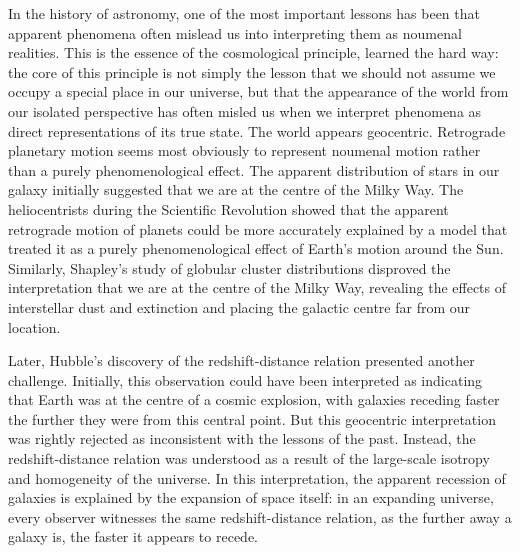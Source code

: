 \documentclass[aps,rmp,groupedaddress,twocolumn,10pt]{revtex4-2}
\begin{document}
In the history of astronomy, one of the most important lessons has been that apparent phenomena often mislead us into interpreting them as noumenal realities. This is the essence of the cosmological principle, learned the hard way: the core of this principle is not simply the lesson that we should not assume we occupy a special place in our universe, but that the appearance of the world from our isolated perspective has often misled us when we interpret phenomena as direct representations of its true state. The world appears geocentric. Retrograde planetary motion seems most obviously to represent noumenal motion rather than a purely phenomenological effect. The apparent distribution of stars in our galaxy initially suggested that we are at the centre of the Milky Way. The heliocentrists during the Scientific Revolution showed that the apparent retrograde motion of planets could be more accurately explained by a model that treated it as a purely phenomenological effect of Earth's motion around the Sun. Similarly, Shapley's study of globular cluster distributions disproved the interpretation that we are at the centre of the Milky Way, revealing the effects of interstellar dust and extinction and placing the galactic centre far from our location.

Later, Hubble's discovery of the redshift-distance relation presented another challenge. Initially, this observation could have been interpreted as indicating that Earth was at the centre of a cosmic explosion, with galaxies receding faster the further they were from this central point. But this geocentric interpretation was rightly rejected as inconsistent with the lessons of the past. Instead, the redshift-distance relation was understood as a result of the large-scale isotropy and homogeneity of the universe. In this interpretation, the apparent recession of galaxies is explained by the expansion of space itself: in an expanding universe, every observer witnesses the same redshift-distance relation, as the further away a galaxy is, the faster it appears to recede.
\end{document}
